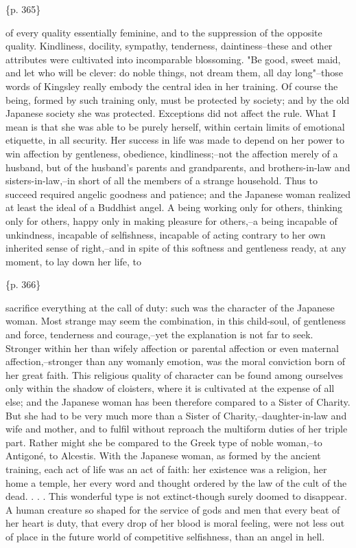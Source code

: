 \{p. 365\}

of every quality essentially feminine, and to the suppression of the opposite quality. Kindliness, docility, sympathy, tenderness, daintiness--these and other attributes were cultivated into incomparable blossoming. "Be good, sweet maid, and let who will be clever: do noble things, not dream them, all day long"--those words of Kingsley really embody the central idea in her training. Of course the being, formed by such training only, must be protected by society; and by the old Japanese society she was protected. Exceptions did not affect the rule. What I mean is that she was able to be purely herself, within certain limits of emotional etiquette, in all security. Her success in life was made to depend on her power to win affection by gentleness, obedience, kindliness;--not the affection merely of a husband, but of the husband's parents and grandparents, and brothers-in-law and sisters-in-law,--in short of all the members of a strange household. Thus to succeed required angelic goodness and patience; and the Japanese woman realized at least the ideal of a Buddhist angel. A being working only for others, thinking only for others, happy only in making pleasure for others,--a being incapable of unkindness, incapable of selfishness, incapable of acting contrary to her own inherited sense of right,--and in spite of this softness and gentleness ready, at any moment, to lay down her life, to

\{p. 366\}

sacrifice everything at the call of duty: such was the character of the Japanese woman. Most strange may seem the combination, in this child-soul, of gentleness and force, tenderness and courage,--yet the explanation is not far to seek. Stronger within her than wifely affection or parental affection or even maternal affection,--stronger than any womanly emotion, was the moral conviction born of her great faith. This religious quality of character can be found among ourselves only within the shadow of cloisters, where it is cultivated at the expense of all else; and the Japanese woman has been therefore compared to a Sister of Charity. But she had to be very much more than a Sister of Charity,--daughter-in-law and wife and mother, and to fulfil without reproach the multiform duties of her triple part. Rather might she be compared to the Greek type of noble woman,--to Antigoné, to Alcestis. With the Japanese woman, as formed by the ancient training, each act of life was an act of faith: her existence was a religion, her home a temple, her every word and thought ordered by the law of the cult of the dead. . . . This wonderful type is not extinct-though surely doomed to disappear. A human creature so shaped for the service of gods and men that every beat of her heart is duty, that every drop of her blood is moral feeling, were not less out of place in the future world of competitive selfishness, than an angel in hell.

